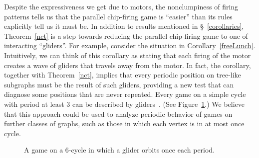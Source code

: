 Despite the expressiveness we get due to motors, the nonclumpiness of firing
patterns tells us that the parallel chip-firing game is ``easier'' than its
rules explicitly tell us it must be. In addition to results mentioned in
\S~\ref{corollaries}, Theorem~\ref{nct} is a step towards reducing the parallel
chip-firing game to one of interacting ``gliders''. For example, consider the
situation in Corollary~\ref{freeLunch}. Intuitively, we can think of this
corollary as stating that each firing of the motor creates a wave of gliders
that travels away from the motor. In fact, the corollary, together with
Theorem~\ref{nct}, implies that every periodic position on tree-like subgraphs
must be the result of such gliders, providing a new test that can diagnose some
positions that are never repeated. Every game on a simple cycle with period at
least 3 can be described by gliders~\cite{cycle}. (See Figure~\ref{cycleFig}.)
We believe that this approach could be used to analyze periodic behavior of
games on further classes of graphs, such as those in which each vertex is in at
most once cycle.

\begin{centering}
\begin{figure}[tbh]
  \caption{A game on a 6-cycle in which a glider orbits once each period.}
  \label{cycleFig}
\end{figure}
\end{centering}

